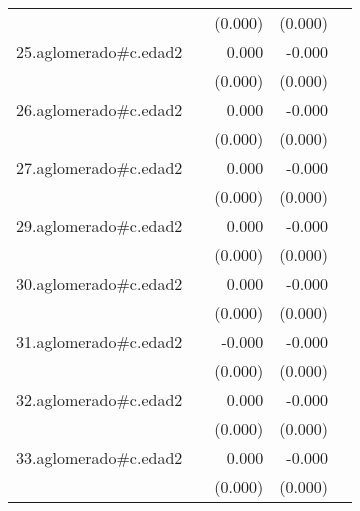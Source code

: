 {\begin{longtable}{l*{4}{D{.}{.}{-1}}}
            &                     &     (0.000)         &     (0.000)         &                     \\
\addlinespace
25.aglomerado#c.edad2&                     &       0.000         &      -0.000\sym{*}  &                     \\
            &                     &     (0.000)         &     (0.000)         &                     \\
\addlinespace
26.aglomerado#c.edad2&                     &       0.000         &      -0.000         &                     \\
            &                     &     (0.000)         &     (0.000)         &                     \\
\addlinespace
27.aglomerado#c.edad2&                     &       0.000         &      -0.000         &                     \\
            &                     &     (0.000)         &     (0.000)         &                     \\
\addlinespace
29.aglomerado#c.edad2&                     &       0.000         &      -0.000         &                     \\
            &                     &     (0.000)         &     (0.000)         &                     \\
\addlinespace
30.aglomerado#c.edad2&                     &       0.000         &      -0.000         &                     \\
            &                     &     (0.000)         &     (0.000)         &                     \\
\addlinespace
31.aglomerado#c.edad2&                     &      -0.000         &      -0.000\sym{***}&                     \\
            &                     &     (0.000)         &     (0.000)         &                     \\
\addlinespace
32.aglomerado#c.edad2&                     &       0.000         &      -0.000\sym{***}&                     \\
            &                     &     (0.000)         &     (0.000)         &                     \\
\addlinespace
33.aglomerado#c.edad2&                     &       0.000         &      -0.000         &                     \\
            &                     &     (0.000)         &     (0.000)         &                     \\

\end{longtable}}
